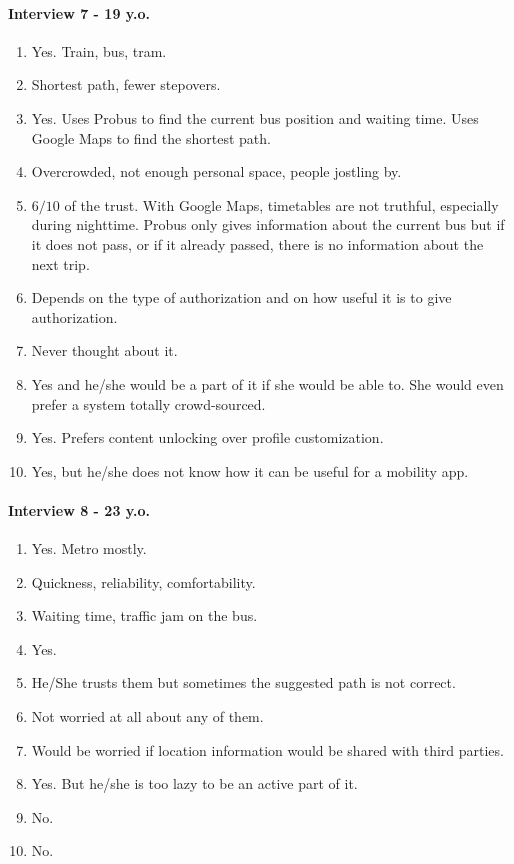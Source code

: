 \documentclass[a4paper, 10pt]{article}
\begin{document}
\paragraph*{Interview 7 - 19 y.o.}
\begin{enumerate}
    \item Yes. Train, bus, tram.
    \item Shortest path, fewer stepovers.
    \item Yes. Uses Probus to find the current bus position and waiting time. Uses Google Maps to find the shortest path.
    \item Overcrowded, not enough personal space, people jostling by.
    \item $6/10$ of the trust. With Google Maps, timetables are not truthful, especially during nighttime. Probus only gives information about the current bus but if it does not pass, or if it already passed, there is no information about the next trip.
    \item  Depends on the type of authorization and on how useful it is to give authorization. 
    \item Never thought about it.
    \item Yes and he/she would be a part of it if she would be able to. She would even prefer a system totally crowd-sourced.
    \item Yes. Prefers content unlocking over profile customization.
    \item Yes, but he/she does not know how it can be useful for a mobility app.
\end{enumerate}

\paragraph*{Interview 8 - 23 y.o.}
\begin{enumerate}
    \item Yes. Metro mostly.
    \item Quickness, reliability, comfortability.
    \item Waiting time, traffic jam on the bus.
    \item Yes.
    \item He/She trusts them but sometimes the suggested path is not correct.
    \item Not worried at all about any of them.
    \item Would be worried if location information would be shared with third parties.
    \item Yes. But he/she is too lazy to be an active part of it.
    \item No.
    \item No.
\end{enumerate}
\end{document}
